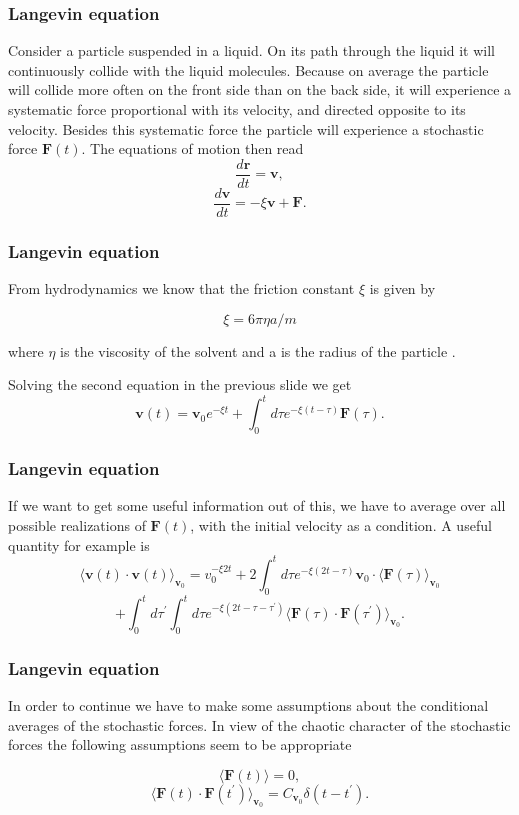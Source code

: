 \documentclass[compress]{beamer}
\renewcommand{\vec}[1]{\boldsymbol{#1}}
\begin{document}
\frame
{
  \frametitle{Langevin equation}
\begin{small}
{\scriptsize
Consider a particle  suspended in a liquid. On its path through the liquid it will continuously collide with the liquid molecules. Because on average the particle  will collide more often on the front side than on the back side, it will experience a systematic force proportional with its velocity, and directed opposite to its velocity. Besides this systematic force the particle  will experience a stochastic force  $ \vec{F}(t)$. 
The equations of motion then read 
\[ 
 \frac{d\vec{r}}{dt} 	=  \vec{v},
\] 	
\[
\frac{d\vec{v}}{dt} 	=  -\xi \vec{v}+\vec{F}.
\]


}
\end{small}
}
\frame
{
  \frametitle{Langevin equation}
\begin{small}
{\scriptsize
From hydrodynamics  we know that the friction constant  $\xi$ is given by

\begin{displaymath}\xi =6\pi \eta a/m \end{displaymath}

where $\eta$ is the viscosity  of the solvent and a is the radius of the particle .

Solving the second equation in the previous slide we get 
\[
\vec{v}(t)=\vec{v}_{0}e^{-\xi t}+\int_{0}^{t}d\tau e^{-\xi (t-\tau )}\vec{F }(\tau ). 
\]
}
\end{small}
}
\frame
{
  \frametitle{Langevin equation}
\begin{small}
{\scriptsize
If we want to get some useful information out of this, we have to average over all possible realizations of 
$ \vec{F}(t)$, with the initial velocity as a condition. A useful quantity for example is
 \[ 
\langle \vec{v}(t)\cdot \vec{v}(t)\rangle_{\vec{v}_{0}}=v_{0}^{-\xi 2t}
+2\int_{0}^{t}d\tau e^{-\xi (2t-\tau)}\vec{v}_{0}\cdot \langle \vec{F}(\tau )\rangle_{\vec{v}_{0}}
\]
\[  	  	
 +\int_{0}^{t}d\tau ^{\prime }\int_{0}^{t}d\tau e^{-\xi (2t-\tau -\tau ^{\prime })}
\langle \vec{F}(\tau )\cdot \vec{F}(\tau ^{\prime })\rangle_{ \vec{v}_{0}}.
\]
}
\end{small}
}
\frame
{
  \frametitle{Langevin equation}
\begin{small}
{\scriptsize
In order to continue we have to make some assumptions about the conditional averages of the stochastic forces. 
In view of the chaotic character of the stochastic forces the following assumptions seem to be appropriate
  
\[ \langle \vec{F}(t)\rangle 	= 	0, \]
\[\langle \vec{F}(t)\cdot \vec{F}(t^{\prime })\rangle_{\vec{v}_{0}}=  C_{\vec{v}_{0}}\delta (t-t^{\prime }).
\] 	

}
\end{small}
}
\end{document}
